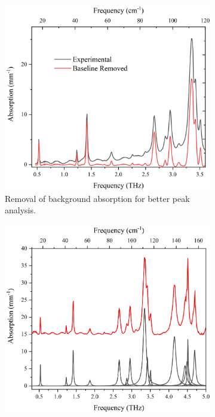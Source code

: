 \begin{figure}
\centering
\begin{subfigure}{1\textwidth}
    \centering
    \includegraphics[scale=0.5]{Figures/Spectra/ExpVsBaselineG.png}
    \caption{Removal of background absorption for better peak analysis.}
    \label{fig:aLM_abs_baseline}
    \vspace{5 mm}
\end{subfigure}
\begin{subfigure}{1\textwidth}
    \centering
    \includegraphics[scale=0.5]{Figures/Spectra/LorentzPeaksG.png}

\end{subfigure}
\end{figure}
